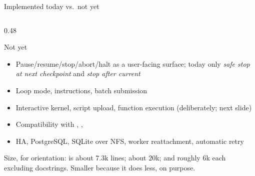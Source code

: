 \begin{frame}{Implemented today vs.\ not yet}
\begin{columns}[T]
\begin{column}{0.48\textwidth}
\begin{alertblock}{Not yet}
\begin{itemize}
                    \item Pause/resume/stop/abort/halt as a user-facing surface; today only
                          \emph{safe stop at next checkpoint} and \emph{stop after current}
                    \item Loop mode, instructions, batch submission
                    \item Interactive kernel, script upload, function execution (deliberately; next slide)
                    \item Compatibility with , ,
                    \item HA, PostgreSQL, SQLite over NFS, worker reattachment, automatic retry
                \end{itemize}
            \end{alertblock}
            \vspace{0.1cm}
            {\scriptsize\color{qsgray} Size, for orientation:  is about 7.3k lines;
             about 20k;  and 
            roughly 6k each excluding docstrings. Smaller because it does less, on purpose.\par}
        \end{column}
    \end{columns}
\end{frame}

